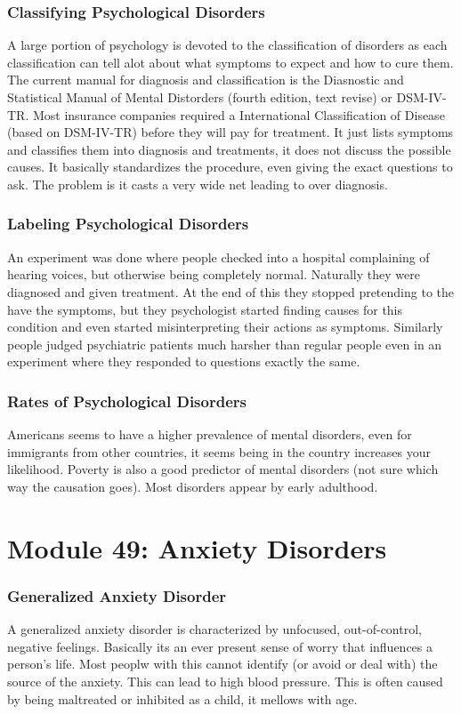 \documentclass[12pt]{article}
\begin{document}
\section*{Classifying Psychological Disorders}
A large portion of psychology is devoted to the classification of disorders as each classification can tell alot about what symptoms to expect and how to cure them. The current manual for diagnosis and classification is the Diasnostic and Statistical Manual of Mental Distorders (fourth edition, text revise) or DSM-IV-TR. Most insurance companies required a International Classification of Disease (based on DSM-IV-TR) before they will pay for treatment. It just lists symptoms and classifies them into diagnosis and treatments, it does not discuss the possible causes. It basically standardizes the procedure, even giving the exact questions to ask. The problem is it casts a very wide net leading to over diagnosis.
\section*{Labeling Psychological Disorders}
An experiment was done where people checked into a hospital complaining of hearing voices, but otherwise being completely normal. Naturally they were diagnosed and given treatment. At the end of this they stopped pretending to the have the symptoms, but they psychologist started finding causes for this condition and even started misinterpreting their actions as symptoms. Similarly people judged psychiatric patients much harsher than regular people even in an experiment where they responded to questions exactly the same.
\section*{Rates of Psychological Disorders}
Americans seems to have a higher prevalence of mental disorders, even for immigrants from other countries, it seems being in the country increases your likelihood. Poverty is also a good predictor of mental disorders (not sure which way the causation goes). Most disorders appear by early adulthood. 

\part*{Module 49: Anxiety Disorders}
\section*{Generalized Anxiety Disorder}
A generalized anxiety disorder is characterized by unfocused, out-of-control, negative feelings. Basically its an ever present sense of worry that influences a person's life. Most peoplw with this cannot identify (or avoid or deal with) the source of the anxiety. This can lead to high blood pressure. This is often caused by being maltreated or inhibited as a child, it mellows with age. 
\end{document}
